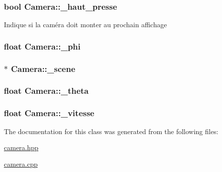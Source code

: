 \hypertarget{class_camera_a43b59b53cb182906d56e6e4d2c31139c}{
\subsubsection[{\+\_\+haut\+\_\+presse}]{\setlength{\rightskip}{0pt plus 5cm}bool Camera\+::\+\_\+haut\+\_\+presse}}\label{class_camera_a43b59b53cb182906d56e6e4d2c31139c}
Indique si la caméra doit monter au prochain affichage \hypertarget{class_camera_a288df53a3ff446ee4367ee47b8499fcd}{
\subsubsection[{\+\_\+phi}]{\setlength{\rightskip}{0pt plus 5cm}float Camera\+::\+\_\+phi\hspace{0.3cm}{\ttfamily [protected]}}}\label{class_camera_a288df53a3ff446ee4367ee47b8499fcd}
\hypertarget{class_camera_a81ffb00eedbaefbfb755b0c13d42180a}{
\subsubsection[{\+\_\+scene}]{$\ast$ Camera\+::\+\_\+scene\hspace{0.3cm}{\ttfamily [protected]}}}\label{class_camera_a81ffb00eedbaefbfb755b0c13d42180a}
\hypertarget{class_camera_aeb3c859c3c254c8296420451259e5629}{
\subsubsection[{\+\_\+theta}]{\setlength{\rightskip}{0pt plus 5cm}float Camera\+::\+\_\+theta\hspace{0.3cm}{\ttfamily [protected]}}}\label{class_camera_aeb3c859c3c254c8296420451259e5629}
\hypertarget{class_camera_a9062fdde515a49bf8db963ac46be9942}{
\subsubsection[{\+\_\+vitesse}]{\setlength{\rightskip}{0pt plus 5cm}float Camera\+::\+\_\+vitesse\hspace{0.3cm}{\ttfamily [protected]}}}\label{class_camera_a9062fdde515a49bf8db963ac46be9942}


The documentation for this class was generated from the following files\+:\begin{DoxyCompactItemize}
\item 
\hyperlink{camera_8hpp}{camera.\+hpp}\item 
\hyperlink{camera_8cpp}{camera.\+cpp}\end{DoxyCompactItemize}
